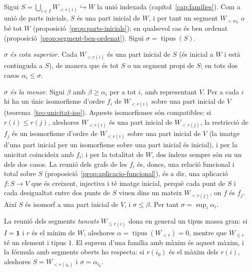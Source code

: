 \begin{prova}
Sigui \(S=\bigcup_{i\in I}W_{<r(i)}\hookrightarrow W\) la unió indexada
(capítol~\ref{cap:families}). Com a unió de parts inicials, \(S\) és una part
inicial de \(W\), i per tant un segment \(W_{<w_0}\) o bé tot \(W\)
(proposició~\ref{prop:parts-inicials}); en qualsevol cas és ben ordenat
(proposició~\ref{prop:segment-ben-ordenat}). Sigui
\(\sigma=\operatorname{tipus}(S)\).

\emph{\(\sigma\) és cota superior.} Cada \(W_{<r(i)}\) és una part inicial de
\(S\) (és inicial a \(W\) i està continguda a \(S\)), de manera que és tot
\(S\) o un segment propi de \(S\); en tots dos casos \(\alpha_i\le\sigma\).

\emph{\(\sigma\) és la menor.} Sigui \(\beta\) amb \(\beta\ge\alpha_i\) per a
tot \(i\), amb representant \(V\). Per a cada \(i\) hi ha un únic
isomorfisme d'ordre \(f_i\) de \(W_{<r(i)}\) sobre una part inicial de \(V\)
(teorema~\ref{teo:unicitat-iso}). Aquests isomorfismes són compatibles: si
\(r(i)\le r(j)\), aleshores \(W_{<r(i)}\) és una part inicial de
\(W_{<r(j)}\), la restricció de \(f_j\) és un isomorfisme d'ordre de
\(W_{<r(i)}\) sobre una part inicial de \(V\) (la imatge d'una part inicial
per un isomorfisme sobre una part inicial és inicial), i per la unicitat
coincideix amb \(f_i\); i per la totalitat de \(W\), dos índexs sempre són
en un dels dos casos. La reunió dels grafs de les \(f_i\) és, doncs, una
relació funcional i total sobre \(S\) (proposició~\ref{prop:aplicacio-funcional}),
és a dir, una aplicació \(f\colon S\to V\) que és creixent, injectiva i té
imatge inicial, perquè cada punt de \(S\) i cada desigualtat entre dos punts
de \(S\) viuen dins un mateix \(W_{<r(j)}\), on \(f\) és \(f_j\). Així \(S\)
és isomorf a una part inicial de \(V\), i \(\sigma\le\beta\). Per tant
\(\sigma=\sup_i\alpha_i\).
\end{prova}

\begin{observacio}\label{obs:suprem-oberts}
La reunió dels segments \emph{tancats} \(W_{\le r(i)}\) dona en general un
tipus massa gran: si \(I=\mathbf1\) i \(r\) és el mínim de \(W\), aleshores
\(\alpha=\operatorname{tipus}(W_{<r})=0\), mentre que \(W_{\le r}\) té un
element i tipus \(1\). El suprem d'una família amb màxim és aquest màxim, i
la fórmula amb segments oberts ho respecta: si \(r(i_0)\) és el màxim dels
\(r(i)\), aleshores \(S=W_{<r(i_0)}\) i \(\sigma=\alpha_{i_0}\).
\end{observacio}

